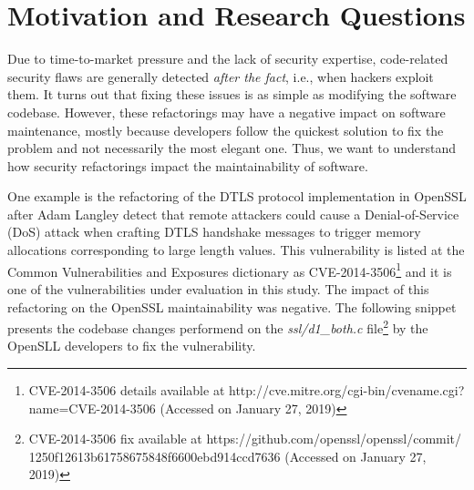 \documentclass[10pt,conference]{IEEEtran}
\begin{document}
\section{Motivation and Research Questions}\label{sec:motivation}
%
Due to time-to-market pressure and the lack of security expertise, code-related
security flaws are generally detected \textit{after the fact}, i.e., when
hackers exploit them. It turns out that fixing these issues is as simple as
modifying the software codebase. However, these refactorings may have a negative
impact on software maintenance, mostly because developers follow the quickest
solution to fix the problem and not necessarily the most elegant one. Thus, we
want to understand how security refactorings impact the maintainability of
software.

One example is the refactoring of the DTLS protocol implementation in OpenSSL after
Adam Langley detect that remote attackers could cause a Denial-of-Service (DoS) attack
when crafting DTLS handshake messages to trigger memory allocations corresponding to large length values.
This vulnerability is listed at the Common Vulnerabilities and Exposures dictionary as CVE-2014-3506\footnote{CVE-2014-3506 details available at http://cve.mitre.org/cgi-bin/cvename.cgi?name=CVE-2014-3506 (Accessed on January 27, 2019)} and
it is one of the vulnerabilities under evaluation in this study. The impact of this refactoring
on the OpenSSL maintainability was negative. The following snippet presents the codebase changes
performend on the \emph{ssl/d1\_both.c} file\footnote{CVE-2014-3506 fix available  at https://github.com/openssl/openssl/commit/\\1250f12613b61758675848f6600ebd914ccd7636 (Accessed on January 27, 2019)} by the OpenSLL developers to fix the vulnerability.
\end{document}
